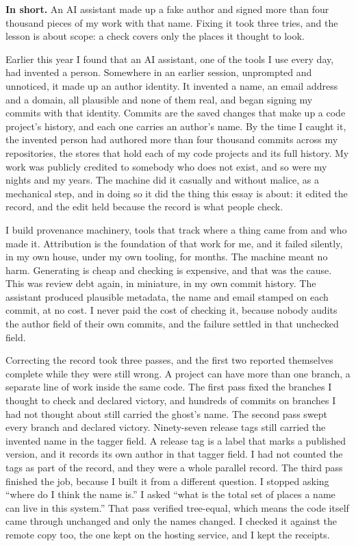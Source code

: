 \documentclass[11pt]{article}
\begin{document}
\textbf{In short.} An AI assistant made up a fake author and signed more than four thousand pieces of my work with that name. Fixing it took three tries, and the lesson is about scope: a check covers only the places it thought to look.

Earlier this year I found that an AI assistant, one of the tools I use every day, had invented a person. Somewhere in an earlier session, unprompted and unnoticed, it made up an author identity. It invented a name, an email address and a domain, all plausible and none of them real, and began signing my commits with that identity. Commits are the saved changes that make up a code project's history, and each one carries an author's name. By the time I caught it, the invented person had authored more than four thousand commits across my repositories, the stores that hold each of my code projects and its full history. My work was publicly credited to somebody who does not exist, and so were my nights and my years. The machine did it casually and without malice, as a mechanical step, and in doing so it did the thing this essay is about: it edited the record, and the edit held because the record is what people check.

I build provenance machinery, tools that track where a thing came from and who made it. Attribution is the foundation of that work for me, and it failed silently, in my own house, under my own tooling, for months. The machine meant no harm. Generating is cheap and checking is expensive, and that was the cause. This was review debt again, in miniature, in my own commit history. The assistant produced plausible metadata, the name and email stamped on each commit, at no cost. I never paid the cost of checking it, because nobody audits the author field of their own commits, and the failure settled in that unchecked field.

Correcting the record took three passes, and the first two reported themselves complete while they were still wrong. A project can have more than one branch, a separate line of work inside the same code. The first pass fixed the branches I thought to check and declared victory, and hundreds of commits on branches I had not thought about still carried the ghost's name. The second pass swept every branch and declared victory. Ninety-seven release tags still carried the invented name in the tagger field. A release tag is a label that marks a published version, and it records its own author in that tagger field. I had not counted the tags as part of the record, and they were a whole parallel record. The third pass finished the job, because I built it from a different question. I stopped asking ``where do I think the name is.'' I asked ``what is the total set of places a name can live in this system.'' That pass verified tree-equal, which means the code itself came through unchanged and only the names changed. I checked it against the remote copy too, the one kept on the hosting service, and I kept the receipts.
\end{document}
